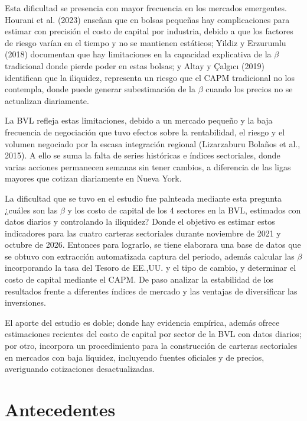 \documentclass[12pt]{article}
\begin{document}
Esta dificultad se presencia con mayor frecuencia en los mercados emergentes. Hourani et al. (2023) enseñan que en bolsas pequeñas hay complicaciones para estimar con precisión el costo de capital por industria, debido a que los factores de riesgo varían en el tiempo y no se mantienen estáticos; Yildiz y Erzurumlu (2018) documentan que hay limitaciones en la capacidad explicativa de la $\beta$ tradicional donde pierde poder en estas bolsas; y Altay y Çalgıcı (2019) identifican que la iliquidez, representa un riesgo que el CAPM tradicional no los contempla, donde puede generar subestimación de la $\beta$ cuando los precios no se actualizan diariamente.

La BVL refleja estas limitaciones, debido a un mercado pequeño y la baja frecuencia de negociación que tuvo efectos sobre la rentabilidad, el riesgo y el volumen negociado por la escasa integración regional (Lizarzaburu Bolaños et al., 2015). A ello se suma la falta de series históricas e índices sectoriales, donde varias acciones permanecen semanas sin tener cambios, a diferencia de las ligas mayores que cotizan diariamente en Nueva York.

La dificultad que se tuvo en el estudio fue palnteada mediante esta pregunta ¿cuáles son las $\beta$ y los costo de capital de los 4 sectores en la BVL, estimados con datos diarios y controlando la iliquidez? Donde el objetivo es estimar estos indicadores para las cuatro carteras sectoriales durante noviembre de 2021 y octubre de 2026. Entonces para lograrlo, se tiene  elaborara una base de datos que se obtuvo con extracción automatizada captura del periodo, además calcular las $\beta$ incorporando la tasa del Tesoro de EE.,UU. y el tipo de cambio, y determinar el costo de capital mediante el CAPM. De paso analizar la estabilidad de los resultados frente a diferentes índices de mercado y las ventajas de diversificar las inversiones. 

El aporte del estudio es doble; donde hay evidencia empírica, además ofrece estimaciones recientes del costo de capital por sector de la BVL con datos diarios; por otro, incorpora un procedimiento para la construcción de carteras sectoriales en mercados con baja liquidez, incluyendo fuentes oficiales y de precios, averiguando cotizaciones desactualizadas. 

\section{Antecedentes}
\end{document}
